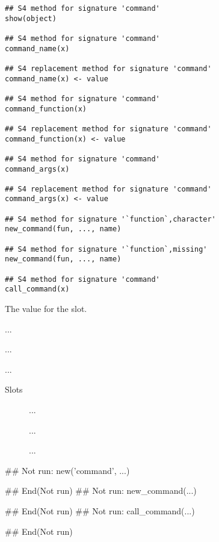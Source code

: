 \documentclass[letterpaper]{book}
\begin{document}
%
\begin{Usage}
\begin{verbatim}
## S4 method for signature 'command'
show(object)

## S4 method for signature 'command'
command_name(x)

## S4 replacement method for signature 'command'
command_name(x) <- value

## S4 method for signature 'command'
command_function(x)

## S4 replacement method for signature 'command'
command_function(x) <- value

## S4 method for signature 'command'
command_args(x)

## S4 replacement method for signature 'command'
command_args(x) <- value

## S4 method for signature '`function`,character'
new_command(fun, ..., name)

## S4 method for signature '`function`,missing'
new_command(fun, ..., name)

## S4 method for signature 'command'
call_command(x)
\end{verbatim}
\end{Usage}
%
\begin{Arguments}
\begin{ldescription}
\item[\code{value}] The value for the slot.

\item[\code{fun}] ...

\item[\code{...}] ...

\item[\code{name}] ...
\end{ldescription}
\end{Arguments}
%
\begin{Section}{Slots}

\begin{description}

\item[] ...

\item[] ...

\item[] ...

\end{description}
\end{Section}
%
\begin{Examples}
\begin{ExampleCode}
## Not run: 
new('command', ...)

## End(Not run)
## Not run: 
new_command(...)

## End(Not run)
## Not run: 
call_command(...)

## End(Not run)
\end{ExampleCode}
\end{Examples}
\end{document}
